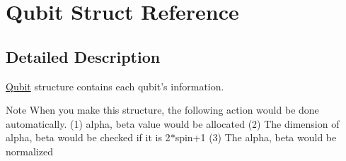 \hypertarget{structQubit}{\section{Qubit Struct Reference}
\label{structQubit}
}


\subsection{Detailed Description}
\hyperlink{structQubit}{Qubit} structure contains each qubit's information. 

\begin{DoxyNote}{Note}
When you make this structure, the following action would be done automatically. (1) alpha, beta value would be allocated (2) The dimension of alpha, beta would be checked if it is 2$\ast$spin+1 (3) The alpha, beta would be normalized 
\end{DoxyNote}

